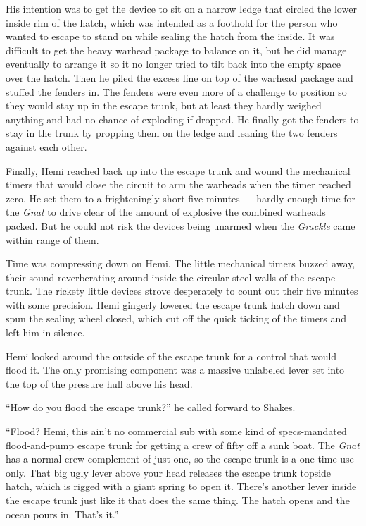 \documentclass[
]{scrbook}
\begin{document}
His intention was to get the device to sit on a narrow ledge that
circled the lower inside rim of the hatch, which was intended as a
foothold for the person who wanted to escape to stand on while sealing
the hatch from the inside. It was difficult to get the heavy warhead
package to balance on it, but he did manage eventually to arrange it so
it no longer tried to tilt back into the empty space over the hatch.
Then he piled the excess line on top of the warhead package and stuffed
the fenders in. The fenders were even more of a challenge to position so
they would stay up in the escape trunk, but at least they hardly weighed
anything and had no chance of exploding if dropped. He finally got the
fenders to stay in the trunk by propping them on the ledge and leaning
the two fenders against each other.

Finally, Hemi reached back up into the escape trunk and wound the
mechanical timers that would close the circuit to arm the warheads when
the timer reached zero. He set them to a frighteningly-short five
minutes --- hardly enough time for the \emph{Gnat} to drive clear of the
amount of explosive the combined warheads packed. But he could not risk
the devices being unarmed when the \emph{Grackle} came within range of
them.

Time was compressing down on Hemi. The little mechanical timers buzzed
away, their sound reverberating around inside the circular steel walls
of the escape trunk. The rickety little devices strove desperately to
count out their five minutes with some precision. Hemi gingerly lowered
the escape trunk hatch down and spun the sealing wheel closed, which cut
off the quick ticking of the timers and left him in silence.

Hemi looked around the outside of the escape trunk for a control that
would flood it. The only promising component was a massive unlabeled
lever set into the top of the pressure hull above his head.

``How do you flood the escape trunk?'' he called forward to Shakes.

``Flood? Hemi, this ain't no commercial sub with some kind of
specs-mandated flood-and-pump escape trunk for getting a crew of fifty
off a sunk boat. The \emph{Gnat} has a normal crew complement of just
one, so the escape trunk is a one-time use only. That big ugly lever
above your head releases the escape trunk topside hatch, which is rigged
with a giant spring to open it. There's another lever inside the escape
trunk just like it that does the same thing. The hatch opens and the
ocean pours in. That's it.''
\end{document}
